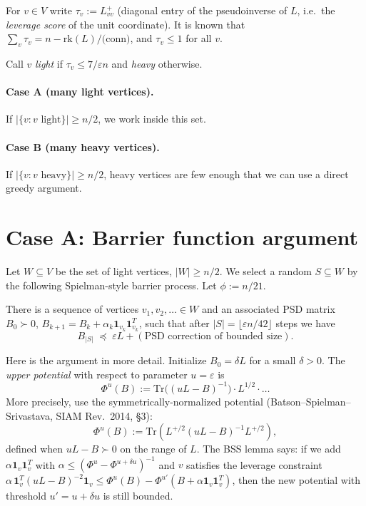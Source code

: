 For $v\in V$ write $\tau_v := L^+_{vv}$ (diagonal entry of the pseudoinverse of $L$, i.e.\ the \emph{leverage score} of the unit coordinate). It is known that $\sum_v \tau_v = n-\mathrm{rk}(L)/\text{(conn)}$, and $\tau_v\leq 1$ for all $v$.

Call $v$ \emph{light} if $\tau_v \leq 7/\varepsilon n$ and \emph{heavy} otherwise.

\paragraph{Case A (many light vertices).} If $|\{v:v\text{ light}\}|\geq n/2$, we work inside this set.

\paragraph{Case B (many heavy vertices).} If $|\{v:v\text{ heavy}\}|\geq n/2$, heavy vertices are few enough that we can use a direct greedy argument.

\section{Case A: Barrier function argument}

Let $W\subseteq V$ be the set of light vertices, $|W|\geq n/2$. We select a random $S\subseteq W$ by the following Spielman-style barrier process. Let $\phi := n/21$.

\begin{lemma}\label{lem:barrier}
There is a sequence of vertices $v_1,v_2,\dots\in W$ and an associated PSD matrix $B_0\succ 0$, $B_{k+1}=B_k + \alpha_k \mathbf{1}_{v_k}\mathbf{1}_{v_k}^T$, such that after $|S|=\lfloor \varepsilon n/42\rfloor$ steps we have
\[
   B_{|S|} \;\preceq\; \varepsilon L + (\text{PSD correction of bounded size}).
\]
\end{lemma}

Here is the argument in more detail. Initialize $B_0 = \delta L$ for a small $\delta>0$. The \emph{upper potential} with respect to parameter $u=\varepsilon$ is
\[
  \Phi^u(B) := \mathrm{Tr}\bigl((uL - B)^{-1}\bigr)\cdot L^{1/2}\cdot\ldots
\]
More precisely, use the symmetrically-normalized potential (Batson--Spielman--Srivastava, SIAM Rev.\ 2014, \S3):
\[
  \Phi^u(B) := \mathrm{Tr}\!\left( L^{+/2} (uL - B)^{-1} L^{+/2}\right),
\]
defined when $uL - B\succ 0$ on the range of $L$. The BSS lemma says: if we add $\alpha \mathbf{1}_v\mathbf{1}_v^T$ with $\alpha\leq (\Phi^u - \Phi^{u+\delta u})^{-1}$ and $v$ satisfies the leverage constraint $\alpha\,\mathbf{1}_v^T(uL-B)^{-2}\mathbf{1}_v\leq \Phi^u(B) - \Phi^{u'}(B + \alpha\mathbf{1}_v\mathbf{1}_v^T)$, then the new potential with threshold $u'=u+\delta u$ is still bounded.

